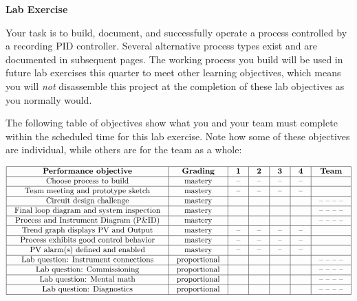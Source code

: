 
\noindent
{\bf Lab Exercise}

\vskip 5pt

Your task is to build, document, and successfully operate a process controlled by a recording PID controller.  Several alternative process types exist and are documented in subsequent pages.  The working process you build will be used in future lab exercises this quarter to meet other learning objectives, which means you will {\it not} disassemble this project at the completion of these lab objectives as you normally would.

The following table of objectives show what you and your team must complete within the scheduled time for this lab exercise.  Note how some of these objectives are individual, while others are for the team as a whole:



$$\vbox{\offinterlineskip
\halign{\strut
\vrule \quad\hfil # \ \hfil & 
\vrule \quad\hfil # \ \hfil & 
\vrule \quad\hfil # \ \hfil & 
\vrule \quad\hfil # \ \hfil & 
\vrule \quad\hfil # \ \hfil & 
\vrule \quad\hfil # \ \hfil & 
\vrule \quad\hfil # \ \hfil \vrule \cr
\noalign{\hrule}
%
{\bf Performance objective} & {\bf Grading} & {\bf 1} & {\bf 2} & {\bf 3} & {\bf 4} & {\bf Team} \cr
%
\noalign{\hrule}
%
Choose process to build & mastery & -- & -- & -- & -- & \cr
%
\noalign{\hrule}
%
Team meeting and prototype sketch & mastery & -- & -- & -- & -- & \cr
%
\noalign{\hrule}
%
Circuit design challenge & mastery & & & & & -- -- -- -- \cr
%
\noalign{\hrule}
%
Final loop diagram and system inspection & mastery & & & & & -- -- -- -- \cr
%
\noalign{\hrule}
%
Process and Instrument Diagram (P\&ID) & mastery & & & & & -- -- -- -- \cr
%
\noalign{\hrule}
%
Trend graph displays PV and Output & mastery & -- & -- & -- & -- &  \cr
%
\noalign{\hrule}
%
Process exhibits good control behavior & mastery & -- & -- & -- & -- &  \cr
%
\noalign{\hrule}
%
PV alarm(s) defined and enabled & mastery & -- & -- & -- & -- &  \cr
%
\noalign{\hrule}
%
Lab question: Instrument connections & proportional &  &  &  &  & -- -- -- -- \cr
%
\noalign{\hrule}
%
Lab question: Commissioning & proportional &  &  &  &  & -- -- -- -- \cr
%
\noalign{\hrule}
%
Lab question: Mental math & proportional &  &  &  &  & -- -- -- -- \cr
%
\noalign{\hrule}
%
Lab question: Diagnostics & proportional &  &  &  &  & -- -- -- -- \cr
%
\noalign{\hrule}
} %
}$$ %

